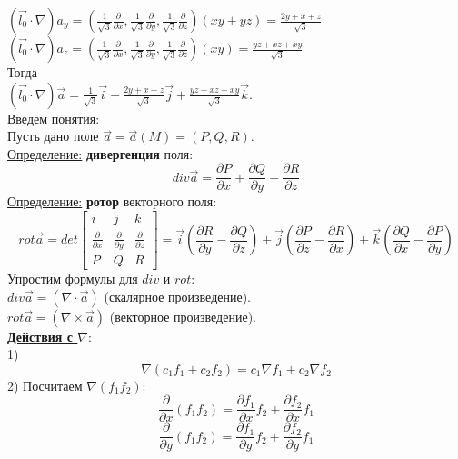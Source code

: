 \documentclass[12pt]{article}
\begin{document}
$(\overrightarrow{l_0} \cdot \nabla)a_y = (\frac{1}{\sqrt{3}} \frac{\partial}{\partial x},\frac{1}{\sqrt{3}} \frac{\partial}{\partial y},\frac{1}{\sqrt{3}} \frac{\partial}{\partial z})(xy+yz) = \frac{2y+x+z}{\sqrt{3}}$\\
$(\overrightarrow{l_0} \cdot \nabla)a_z = (\frac{1}{\sqrt{3}} \frac{\partial}{\partial x},\frac{1}{\sqrt{3}} \frac{\partial}{\partial y},\frac{1}{\sqrt{3}} \frac{\partial}{\partial z})(xy) = \frac{yz+xz+xy}{\sqrt{3}}$\\
Тогда\\
$(\overrightarrow{l_0} \cdot \nabla)\overrightarrow{a} = \frac{1}{\sqrt{3}}\overrightarrow{i} + \frac{2y+x+z}{\sqrt{3}}\overrightarrow{j} + \frac{yz+xz+xy}{\sqrt{3}}\overrightarrow{k}$.\\
\uline{Введем понятия:}\\
Пусть дано поле $\overrightarrow{a} = \overrightarrow{a}(M) = (P,Q,R)$.\\
\uline{Определение:} \textbf{дивергенция} поля:\\
$$div\overrightarrow{a} = \frac{\partial P}{\partial x} + \frac{\partial Q}{\partial y} + \frac{\partial R}{\partial z}$$
\uline{Определение:} \textbf{ротор} векторного поля:\\
$$rot\overrightarrow{a} = det \begin{bmatrix} i & j & k \\ \frac{\partial}{\partial x} & \frac{\partial}{\partial y} & \frac{\partial}{\partial z} \\ P & Q & R \end{bmatrix} = \overrightarrow{i} (\frac{\partial R}{\partial y} - \frac{\partial Q}{\partial z}) + \overrightarrow{j}(\frac{\partial P}{\partial z} - \frac{\partial R}{\partial x}) + \overrightarrow{k}(\frac{\partial Q}{\partial x} - \frac{\partial P}{\partial y})$$
Упростим формулы для $div$ и $rot$:\\
$div \overrightarrow{a} = (\nabla \cdot \overrightarrow{a})$ (скалярное произведение).\\
$rot \overrightarrow{a} = (\nabla \times \overrightarrow{a})$ (векторное произведение).\\
\uline{\textbf{Действия с $\nabla$}}:\\
1) $$\nabla(c_1 f_1 + c_2 f_2) = c_1 {\nabla f_1} + c_2 {\nabla f_2}$$
2) Посчитаем $\nabla(f_1 f_2)$:\\
$$\frac{\partial}{\partial x}(f_1 f_2) = \frac{\partial f_1}{\partial x} f_2 + \frac{\partial f_2}{\partial x} f_1$$
$$\frac{\partial}{\partial y}(f_1 f_2) = \frac{\partial f_1}{\partial y} f_2 + \frac{\partial f_2}{\partial y} f_1$$
\end{document}
